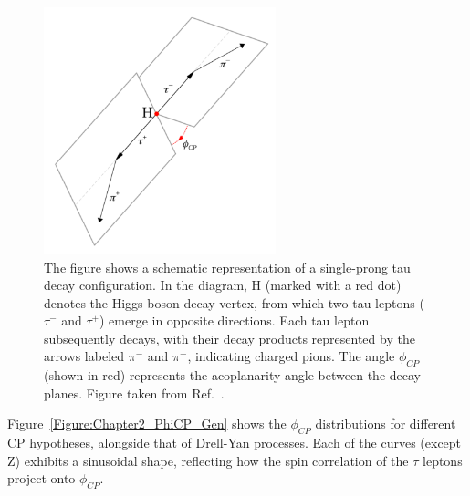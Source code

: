 \begin{figure}[h]
\centering
\includegraphics[width= 0.6\textwidth]{Figures/Chapter2/DecayPlanes.png}
\caption{The figure shows a schematic representation of a single-prong tau decay configuration. In the diagram, H (marked with a red dot) denotes the Higgs boson decay vertex, from which two tau leptons ($\tau^{-}$ and $\tau^{+}$) emerge in opposite directions. Each tau lepton subsequently decays, with their decay products represented by the arrows labeled $\pi^{-}$ and $\pi^{+}$, indicating charged pions. The angle $\phi_{CP}$ (shown in red) represents the acoplanarity angle between the decay planes. Figure taken from Ref.~\cite{HiggsCP_CMS_2021}.}
\label{Figure:Chapter2_DecayPlanes}
\end{figure}

Figure~\ref{Figure:Chapter2_PhiCP_Gen} shows the $\phi_{CP}$ distributions for different CP hypotheses, alongside that of Drell-Yan processes. Each of the curves (except Z) exhibits a sinusoidal shape, reflecting how the spin correlation of the $\tau$ leptons project onto $\phi_{CP}$. 

